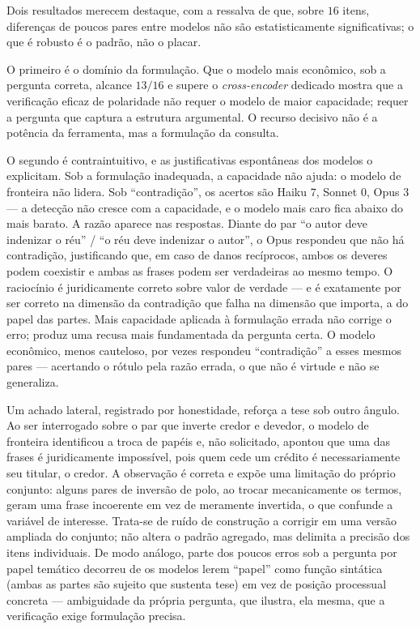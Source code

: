\documentclass[11pt]{article}
\begin{document}
Dois resultados merecem destaque, com a ressalva de que, sobre $16$ itens,
diferenças de poucos pares entre modelos não são estatisticamente significativas;
o que é robusto é o padrão, não o placar.

O primeiro é o domínio da formulação. Que o modelo mais econômico, sob a pergunta
correta, alcance $13/16$ e supere o \textit{cross-encoder} dedicado mostra que a
verificação eficaz de polaridade não requer o modelo de maior capacidade; requer a
pergunta que captura a estrutura argumental. O recurso decisivo não é a potência
da ferramenta, mas a formulação da consulta.

O segundo é contraintuitivo, e as justificativas espontâneas dos modelos o
explicitam. Sob a formulação inadequada, a capacidade não ajuda: o modelo de
fronteira não lidera. Sob ``contradição'', os acertos são Haiku $7$, Sonnet $0$,
Opus $3$ --- a detecção não cresce com a capacidade, e o modelo mais caro fica
abaixo do mais barato. A razão aparece nas respostas. Diante do par ``o autor deve
indenizar o réu'' / ``o réu deve indenizar o autor'', o Opus respondeu que não há
contradição, justificando que, em caso de danos recíprocos, ambos os deveres podem
coexistir e ambas as frases podem ser verdadeiras ao mesmo tempo. O raciocínio é
juridicamente correto sobre valor de verdade --- e é exatamente por ser correto na
dimensão da contradição que falha na dimensão que importa, a do papel das partes.
Mais capacidade aplicada à formulação errada não corrige o erro; produz uma recusa
mais fundamentada da pergunta certa. O modelo econômico, menos cauteloso, por vezes
respondeu ``contradição'' a esses mesmos pares --- acertando o rótulo pela razão
errada, o que não é virtude e não se generaliza.

Um achado lateral, registrado por honestidade, reforça a tese sob outro ângulo. Ao
ser interrogado sobre o par que inverte credor e devedor, o modelo de fronteira
identificou a troca de papéis e, não solicitado, apontou que uma das frases é
juridicamente impossível, pois quem cede um crédito é necessariamente seu titular,
o credor. A observação é correta e expõe uma limitação do próprio conjunto: alguns
pares de inversão de polo, ao trocar mecanicamente os termos, geram uma frase
incoerente em vez de meramente invertida, o que confunde a variável de interesse.
Trata-se de ruído de construção a corrigir em uma versão ampliada do conjunto; não
altera o padrão agregado, mas delimita a precisão dos itens individuais. De modo
análogo, parte dos poucos erros sob a pergunta por papel temático decorreu de os
modelos lerem ``papel'' como função sintática (ambas as partes são sujeito que
sustenta tese) em vez de posição processual concreta --- ambiguidade da própria
pergunta, que ilustra, ela mesma, que a verificação exige formulação precisa.
\end{document}
